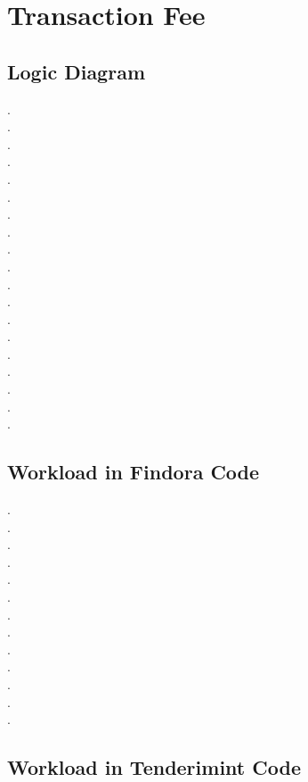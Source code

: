 \section{Transaction Fee}

\subsection{Logic Diagram}

. \\
. \\
. \\
. \\
. \\
. \\
. \\
. \\
. \\
. \\
. \\
. \\
. \\
. \\
. \\
. \\
. \\
. \\
. \\

\subsection{Workload in Findora Code}

. \\
. \\
. \\
. \\
. \\
. \\
. \\
. \\
. \\
. \\
. \\
. \\
. \\

\subsection{Workload in Tenderimint Code} \label{tendermint:CreateProposalBlock}

